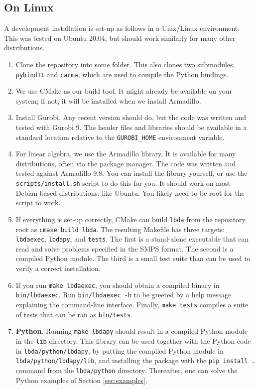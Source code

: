 \documentclass[12pt, english]{article}
\begin{document}
\subsection{On Linux}
A development installation is set-up as follows in a Unix/Linux environment. This was tested on Ubuntu 20.04, but should work similarly for many other distributions.
\begin{enumerate}
	\item Clone the repository into some folder. This also clones two submodules, \texttt{pybind11} and \texttt{carma}, which are used to compile the Python bindings.
	
	\item We use CMake as our build tool. It might already be available on your system; if not, it will be installed when we install Armadillo.
	
	\item Install Gurobi. Any recent version should do, but the code was written and tested with Gurobi 9. The header files and libraries should be available in a standard location relative to the \texttt{GUROBI\_HOME} environment variable.
	
	\item For linear algebra, we use the Armadillo library. It is available for many distributions, often via the package manager. The code was written and tested against Armadillo 9.8. You can install the library yourself, or use the \texttt{scripts/install.sh} script to do this for you. It should work on most Debian-based distributions, like Ubuntu. You likely need to be root for the script to work.
	
	\item If everything is set-up correctly, CMake can build \texttt{lbda} from the repository root as \texttt{cmake build lbda}. The resulting Makefile has three targets: \texttt{lbdaexec}, \texttt{lbdapy}, and \texttt{tests}. The first is a stand-alone executable that can read and solve problems specified in the SMPS format. The second is a compiled Python module. The third is a small test suite than can be used to verify a correct installation.
	
	\item If you run \texttt{make lbdaexec}, you should obtain a compiled binary in \texttt{bin/lbdaexec}. Run \texttt{bin/lbdaexec -h} to be greeted by a help message explaining the command-line interface. Finally, \texttt{make tests} compiles a suite of tests that can be ran as \texttt{bin/tests}.

	\item \textbf{Python}. Running \texttt{make lbdapy} should result in a compiled Python module in the \texttt{lib} directory. This library can be used together with the Python code in \texttt{lbda/python/lbdapy}, by putting the compiled Python module in \texttt{lbda/python/lbdapy/lib}, and installing the package with the \texttt{pip install .} command from the \texttt{lbda/python} directory. Thereafter, one can solve the Python examples of Section \ref{sec:examples}.
\end{enumerate}
\end{document}
